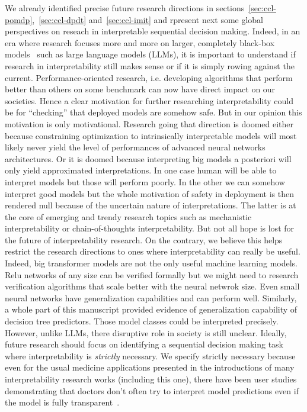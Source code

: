 We already identified precise future research directions in sections~\ref{sec:ccl-pomdp},~\ref{sec:ccl-dpdt} and~\ref{sec:ccl-imit} and rpresent next some global perspectives on reseach in interpretable sequential decision making.
Indeed, in an era where research focuses more and more on larger, completely black-box models~\cite{all-you-need} such as large language models (LLMs), it is important to understand if research in interpretability still makes sense or if it is simply rowing against the current.
Performance-oriented research, i.e. developing algorithms that perform better than others on some benchmark can now have direct impact on our societies.
Hence a clear motivation for further researching interpretability could be for ``checking'' that deployed models are somehow safe.
But in our opinion this motivation is only motivational.
Research going that direction is doomed either because constraining optimization to intrinsically interpretable models will most likely never yield the level of performances of advanced neural networks architectures.
Or it is doomed because interpreting big models a posteriori will only yield approximated interpretations.
In one case human will be able to interpret models but those will perform poorly. 
In the other we can somehow interpret good models but the whole motivation of safety in deployment is then rendered null because of the uncertain nature of interpretations.
The latter is at the core of emerging and trendy research topics such as mechanistic interpretability or chain-of-thoughts interpretability.
But not all hope is lost for the future of interpretability research.
On the contrary, we believe this helps restrict the research directions to ones where interpretability can really be useful.
Indeed, big transformer models are not the only useful machine learning models.
Relu networks of any size can be verified formally but we might need to research verification algorithms that scale better with the neural netwrok size.
Even small neural networks have generalization capabilities and can perform well.
Similarly, a whole part of this manuscript provided evidence of generalization capability of decision tree predictors.
Those model classes could be interpreted precisely.
However, unlike LLMs, there disruptive role in society is still unclear.
Ideally, future research should focus on identifying a sequential decision making task where interpretability is \textit{strictly} necessary.
We specify strictly necessary because even for the usual medicine applications presented in the introductions of many interpretability research works (including this one), there have been user studies demonstrating that doctors don't often try to interpret model predictions even if the model is fully transparent~\cite{festor}.
